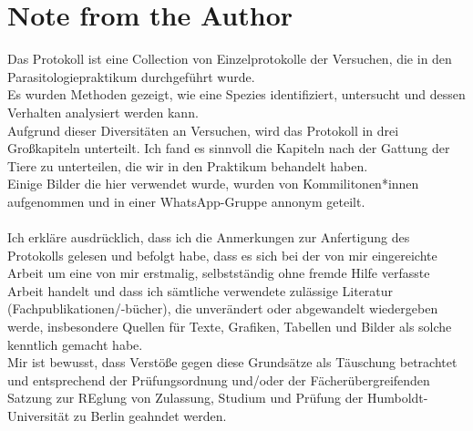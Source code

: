 \documentclass[oneside,10pt,a4paper]{report}
\begin{document}
	
	\tableofcontents
	\chapter{Note from the Author}
	Das Protokoll ist eine Collection von Einzelprotokolle der Versuchen, die in den Parasitologiepraktikum durchgeführt wurde.\\
	Es wurden Methoden gezeigt, wie eine Spezies identifiziert, untersucht und dessen Verhalten analysiert werden kann.\\
	Aufgrund dieser Diversitäten an Versuchen, wird das Protokoll in drei Großkapiteln unterteilt. Ich fand es sinnvoll die Kapiteln nach der Gattung der Tiere zu unterteilen, die wir in den Praktikum behandelt haben.\\
	Einige Bilder die hier verwendet wurde, wurden von Kommilitonen*innen aufgenommen und in einer WhatsApp-Gruppe annonym geteilt.\\
	\\
	Ich erkläre ausdrücklich, dass ich die Anmerkungen zur Anfertigung des Protokolls gelesen und befolgt habe, dass es sich bei der von mir eingereichte Arbeit um eine von mir erstmalig, selbstständig ohne fremde Hilfe verfasste Arbeit handelt und dass ich sämtliche verwendete zulässige Literatur (Fachpublikationen/-bücher), die unverändert oder abgewandelt wiedergeben werde, insbesondere Quellen für Texte, Grafiken, Tabellen und Bilder als solche kenntlich gemacht habe.\\
	Mir ist bewusst, dass Verstöße gegen diese Grundsätze als Täuschung betrachtet und entsprechend der Prüfungsordnung und/oder der Fächerübergreifenden Satzung zur REglung von Zulassung, Studium und Prüfung der Humboldt-Universität zu Berlin geahndet werden.
	
	
\end{document}
